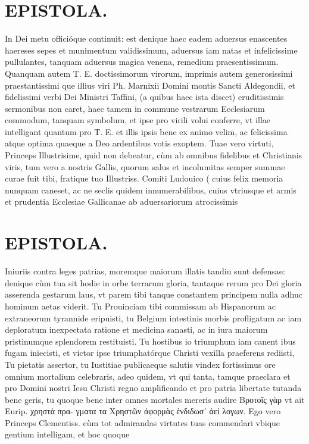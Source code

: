 \documentclass{article}
\begin{document}
\begin{pages}
\section*{EPISTOLA. }\pstart In Dei metu officióque continuit: est denique haec eadem aduersus enascentes haereses sepes et munimentum validissimum, aduersus iam natas et infelicissime pullulantes, tanquam aduersus magica venena, remedium praesentissimum. Quanquam autem T. E. doctissimorum virorum, imprimis autem generosissimi praestantissimi que illius viri Ph. Marnixii Domini montis Sancti Aldegondii, et fidelissimi verbi Dei Ministri Taffini, (a quibus haec ista discet) eruditissimis sermonibus non caret, haec tamem in commune vestrarum Ecclesiarum commodum, tanquam symbolum, et ipse pro virili volui conferre, vt illae intelligant quantum pro T. E. et illis ipsis bene ex animo velim, ac felicissima atque optima quaeque a Deo ardentibus votis exoptem. Tuae vero virtuti, Princeps Illustrisime, quid non debeatur, cùm ab omnibus fidelibus et Christianis viris, tum vero a nostris Gallis, quorum salus et incolumitas semper summae curae fuit tibi, fratique tuo Illustriss. Comiti Ludouico ( cuius felix memoria nunquam caneset, ac ne seclis quidem innumerabilibus, cuius vtriusque et armis et prudentia Ecclesiae Gallicanae ab aduersariorum atrocissimis  \pend
\section*{EPISTOLA. }\pstart Iniuriis contra leges patrias, moremque maiorum illatis tandiu sunt defensae: denique cùm tua sit hodie in orbe terrarum gloria, tantaque rerum pro Dei gloria asserenda gestarum laus, vt parem tibi tanque constantem principem nulla adhuc hominum aetas viderit. Tu Prouinciam tibi commissam ab Hispanorum ac extraneorum tyrannide eripuisti, tu Belgium intestinis morbis profligatum ac iam deploratum inexpectata ratione et medicina sanasti, ac in iura maiorum pristinumque splendorem restituisti. Tu hostibus io triumphum iam canent ibus fugam iniecisti, et victor ipse triumphatórque Christi vexilla praeferens rediisti, Tu pietatis assertor, tu Iustitiae publicaeque salutis vindex fortissimus ore omnium mortalium celebraris, adeo quidem, vt qui tanta, tamque praeclara et pro Domini nostri Iesu Christi regno amplificando et pro patria libertate tutanda bene geris, tu quoque  bene inter omnes mortales mereris audire Βροτοῖς γὰρ vt ait Eurip. χρηστὰ πρα- γματα τα Χρηστῶν ἀφορμὰς ἐνδιδωσ᾽ ἀεί λογων. Ego vero Princeps Clementiss. cùm tot admirandas virtutes tuas commendari vbique gentium intelligam, et hoc quoque  \pend

\end{pages}
\end{document}
